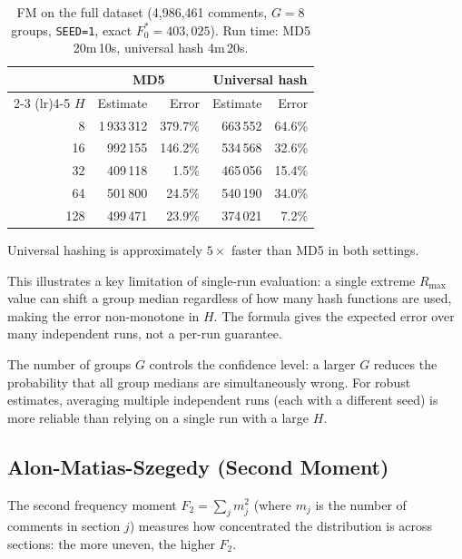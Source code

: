 \documentclass[11pt,a4paper]{article}
\begin{document}
\begin{table}[H]
\centering
\begin{tabular}{r rr rr}
\toprule
& \multicolumn{2}{c}{MD5} & \multicolumn{2}{c}{Universal hash} \\
\cmidrule(lr){2-3} \cmidrule(lr){4-5}
$H$ & Estimate & Error & Estimate & Error \\
\midrule
  8 & 1\,933\,312 & 379.7\% & 663\,552 &  64.6\% \\
 16 &   992\,155 & 146.2\% & 534\,568 &  32.6\% \\
 32 &   409\,118 &   1.5\% & 465\,056 &  15.4\% \\
 64 &   501\,800 &  24.5\% & 540\,190 &  34.0\% \\
128 &   499\,471 &  23.9\% & 374\,021 &   7.2\% \\
\bottomrule
\end{tabular}
\caption{FM on the full dataset (4,986,461 comments, $G=8$ groups, \texttt{SEED=1},
  exact $F_0^* = 403{,}025$). Run time: MD5 20m\,10s, universal hash 4m\,20s.}
\label{tab:fm}
\end{table}

Universal hashing is approximately $5\times$ faster than MD5 in both settings.

This illustrates a key limitation of single-run evaluation: a single extreme
$R_{\max}$ value can shift a group median regardless of how many hash functions
are used, making the error non-monotone in $H$.
The formula gives the expected error over many independent runs, not a per-run guarantee.

The number of groups $G$ controls the confidence level: a larger $G$ reduces the
probability that all group medians are simultaneously wrong.
For robust estimates, averaging multiple independent runs (each with a different seed)
is more reliable than relying on a single run with a large $H$.

\subsection{Alon-Matias-Szegedy (Second Moment)}

The second frequency moment $F_2 = \sum_{j} m_j^2$ (where $m_j$ is the number of
comments in section $j$) measures how concentrated the distribution is across sections:
the more uneven, the higher $F_2$.
\end{document}
